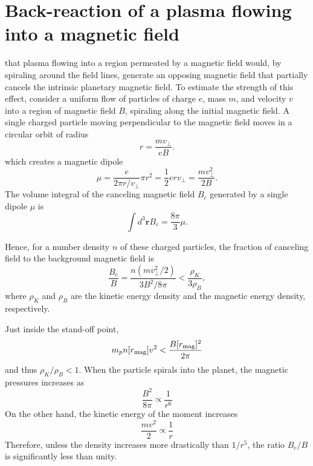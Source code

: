 \documentclass[iop,numberedappendix,apj,twocolappendix,]{emulateapj}
\def\revise#1{\color{blue}{\bf #1} \color{black}}
\begin{document}
\section{Back-reaction of a plasma flowing into a magnetic field}
\label{ss:offset}

\revise{Given that the density of stellar wind of evolved stars is fairly high, one might anticipate }
that \revise{massive} plasma flowing into a region permeated by a magnetic field would, by spiraling around the field lines, generate an opposing magnetic field that partially cancels the intrinsic planetary magnetic field. 
To estimate the strength of this effect, consider a uniform flow of particles of charge $e$, mass $m$, and velocity $v$ into a region of magnetic field $B$, spiraling along the initial magnetic field. 
A single charged particle moving perpendicular to the magnetic field moves in a circular orbit of radius 
\begin{equation}
r=\frac{mv_\bot }{eB}.
\end{equation}
which creates a magnetic dipole
\begin{equation}
\mu = \frac{e}{2\pi r/v_\bot} \pi r^2 = \frac{1}{2} e r v_\bot = \frac{mv_\bot^2}{2B}.
\end{equation}
The volume integral of the canceling magnetic field $B_c$ generated by a single dipole $\mu$ is
\begin{equation}
\int d^3{\boldsymbol r} B_c = \frac{8\pi}{3} \mu.
\end{equation}

Hence, for a number density $n$ of these charged particles, the fraction of canceling field to the background magnetic field is
\begin{equation}
\frac{B_c}{B} = \frac{n(mv_\bot^2/2)}{3 B^2/8\pi} < \frac{\rho_K}{3\rho_B},
\end{equation}
where $\rho_K$ and $\rho_B$ are the kinetic energy density and the magnetic energy density, respectively. 

Just inside the stand-off point, 
\begin{equation}
m_p n[r_{\rm mag}] v^2 < \frac{B[r_{\rm mag}]^2}{2\pi }
\end{equation}
and thus $\rho_K/\rho _B < 1$. 
When the particle spirals into the planet, 
the magnetic pressures increases as 
\begin{equation}
\frac{B^2}{8\pi } \propto \frac{1}{r^6}
\end{equation}
On the other hand, the kinetic energy of the moment increases
\begin{equation}
\frac{mv^2}{2} \propto \frac{1}{r}
\end{equation}
Therefore, unless the density increases more drastically than $1/r^5$, the ratio $B_c/B$ is significantly less than unity. 
 
\end{document}
